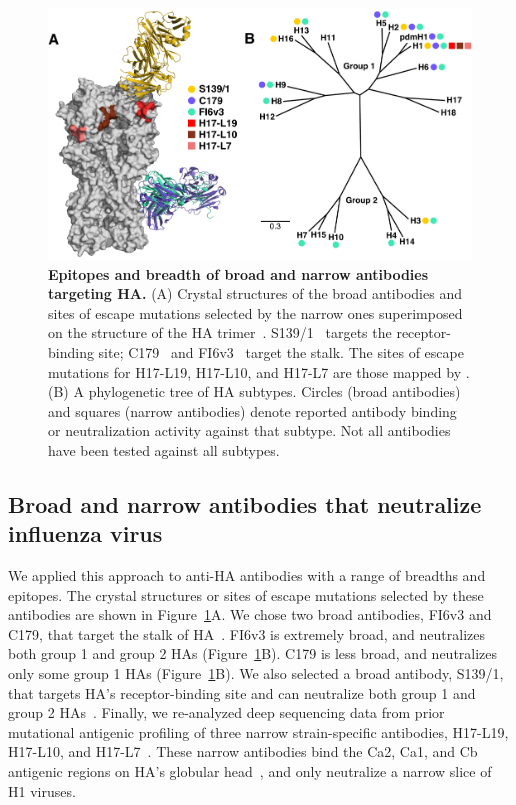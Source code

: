 \documentclass[11pt]{article}
\begin{document}
\begin{figure}
\centerline{\includegraphics[width=\textwidth]{figs/antibody_summary_fig/Ab_summary.pdf}}
\caption{\label{fig:antibody_summary}
{\bf Epitopes and breadth of broad and narrow antibodies targeting HA.}
(A) Crystal structures of the broad antibodies and sites of escape mutations selected by the narrow ones superimposed on the structure of the HA trimer~\citep[PDB 1RVX;][]{gamblin2004structure}. 
S139/1~\citep[PDB 4GMS;][]{lee2012heterosubtypic} targets the receptor-binding site; C179~\citep[PDB 4HLZ;][]{dreyfus2013structure} and FI6v3~\citep[PDB 3ZTN;][]{corti2011neutralizing} target the stalk. 
The sites of escape mutations for H17-L19, H17-L10, and H17-L7 are those mapped by \citet{doud2017complete}. 
(B) A phylogenetic tree of HA subtypes.
Circles (broad antibodies) and squares (narrow antibodies) denote reported antibody binding or neutralization activity against that subtype. 
Not all antibodies have been tested against all subtypes. 
}
\end{figure}

\subsection*{Broad and narrow antibodies that neutralize influenza virus}
We applied this approach to anti-HA antibodies with a range of breadths and epitopes.
The crystal structures or sites of escape mutations selected by these antibodies are shown in Figure~\ref{fig:antibody_summary}A.
We chose two broad antibodies, FI6v3 and C179, that target the stalk of HA~\citep{corti2011neutralizing, okuno1993common, dreyfus2013structure}. 
FI6v3 is extremely broad, and neutralizes both group 1 and group 2 HAs (Figure~\ref{fig:antibody_summary}B).
C179 is less broad, and neutralizes only some group 1 HAs (Figure~\ref{fig:antibody_summary}B).
We also selected a broad antibody, S139/1, that targets HA's receptor-binding site and can neutralize both group 1 and group 2 HAs~\citep{yoshida2009cross, lee2012heterosubtypic}.
Finally, we re-analyzed deep sequencing data from prior mutational antigenic profiling of three narrow strain-specific antibodies, H17-L19, H17-L10, and H17-L7~\citep{doud2017complete}.
These narrow antibodies bind the Ca2, Ca1, and Cb antigenic regions on HA's globular head~\citep{caton1982antigenic}, and only neutralize a narrow slice of H1 viruses.
\end{document}
